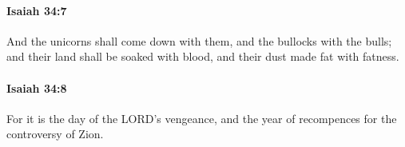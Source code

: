 		\paragraph{Isaiah 34:7} %
			\label{ISAIAH-34-7}

			And the unicorns shall come down with them, and the bullocks with the bulls; and their land shall be soaked with blood, and their dust made fat with fatness.


		\paragraph{Isaiah 34:8} %
			\label{ISAIAH-34-8}

			For it is the day of the LORD's vengeance, and the year of recompences for the controversy of Zion.


